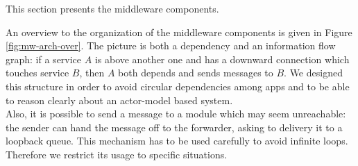 This section presents the middleware components.

An overview to the organization of the middleware components is given in Figure
\ref{fig:mw-arch-over}. The picture is both a dependency and an information flow
graph: if a service $A$ is above another one and has a downward connection
which touches service $B$, then $A$ both depends and sends messages to $B$.
We designed this structure in order to avoid circular dependencies among
apps and to be able to reason clearly about an actor-model based system.
\\

Also, it is possible to send a message to a module which may seem
unreachable: the sender can hand the message off to the
forwarder, asking to delivery it to a loopback queue.
This mechanism has to be used carefully to avoid infinite loops. Therefore
we restrict its usage to specific situations.

